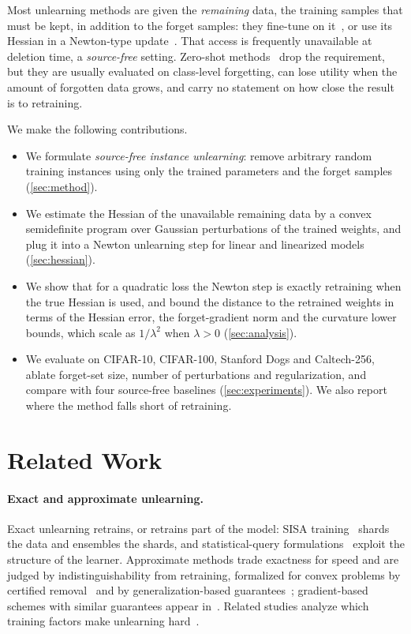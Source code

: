 \documentclass[10pt,twocolumn,letterpaper]{article}
\begin{document}
Most unlearning methods are given the \emph{remaining} data, the training samples that must be kept, in addition to the forget samples: they fine-tune on it~\cite{golatkar2020eternal,kurmanji2023}, or use its Hessian in a Newton-type update~\cite{guo2020,sekhari2021,mehta2022}.
That access is frequently unavailable at deletion time, a \emph{source-free} setting.
Zero-shot methods~\cite{chundawat2023zeroshot,foster2024jit,foster2024ssd} drop the requirement, but they are usually evaluated on class-level forgetting, can lose utility when the amount of forgotten data grows, and carry no statement on how close the result is to retraining.

We make the following contributions.
\begin{itemize}
  \item We formulate \emph{source-free instance unlearning}: remove arbitrary random training instances using only the trained parameters and the forget samples (\cref{sec:method}).
  \item We estimate the Hessian of the unavailable remaining data by a convex semidefinite program over Gaussian perturbations of the trained weights, and plug it into a Newton unlearning step for linear and linearized models (\cref{sec:hessian}).
  \item We show that for a quadratic loss the Newton step is exactly retraining when the true Hessian is used, and bound the distance to the retrained weights in terms of the Hessian error, the forget-gradient norm and the curvature lower bounds, which scale as $1/\lambda^2$ when $\lambda>0$ (\cref{sec:analysis}).
  \item We evaluate on CIFAR-10, CIFAR-100, Stanford Dogs and Caltech-256, ablate forget-set size, number of perturbations and regularization, and compare with four source-free baselines (\cref{sec:experiments}). We also report where the method falls short of retraining.
\end{itemize}

\section{Related Work}
\label{sec:related_work}
\paragraph{Exact and approximate unlearning.}
Exact unlearning retrains, or retrains part of the model: SISA training~\cite{bourtoule2021} shards the data and ensembles the shards, and statistical-query formulations~\cite{cao2015,ginart2019} exploit the structure of the learner.
Approximate methods trade exactness for speed and are judged by indistinguishability from retraining, formalized for convex problems by certified removal~\cite{guo2020} and by generalization-based guarantees~\cite{sekhari2021}; gradient-based schemes with similar guarantees appear in~\cite{neel2021}.
Related studies analyze which training factors make unlearning hard~\cite{thudi2022}.
\end{document}
